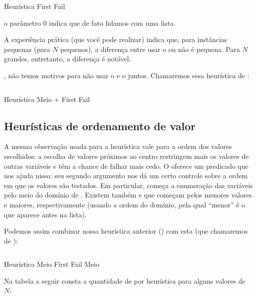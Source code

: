     \begin{listing}
    \inputminted{prolog}{../Exemplos/Cap11/prog4_queensHeurFrstFail.ecl}
    \caption{Heurística First Fail}
    \end{listing}

\noindent o parâmetro 0 indica que de fato lidamos com uma lista.

A experiência prática (que você pode realizar) indica que, para instâncias pequenas (para $N$ pequenos), a diferença entre usar
o  ou não é pequena. Para $N$ grandes, entretanto, a diferença é notável.

 , não temos motivos  para não usar o  e o
 juntos. Chamaremos essa heurística de :

    \begin{listing}
    \inputminted{prolog}{../Exemplos/Cap11/prog5_queensHeurMoff.ecl}
    \caption{Heurística Meio + First Fail}
    \end{listing}

\subsection{Heurísticas de ordenamento de valor}

A mesma observação usada para a heurística  vale para a ordem dos valores
escolhidos: a escolha de valores próximos ao centro restringem mais os valores de outras variáveis e
têm a chance de falhar mais cedo. O \eclipse oferece um predicado  que nos ajuda
nisso: seu segundo argumento nos dá um certo controle sobre a ordem em que os valores são testados.
Em particular,  começa a enumeração das variáveis pelo meio do domínio
de . Existem também  e  que começam
pelos menores valores e maiores, respectivamente (usando a ordem do domínio, pela qual ``menor'' é o
que aparece antes na lista).

Podemos assim combinar nossa heurística anterior () com esta (que chamaremos de
):

    \begin{listing}[H]
    \inputminted{prolog}{../Exemplos/Cap11/prog6_queensHeurMoffMo.ecl}
    \caption{Heurística Meio First Fail Meio}
    \end{listing}

Na tabela a seguir consta a quantidade de  por heurística para alguns
valores de $N$:

